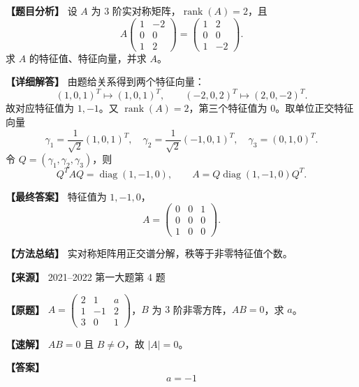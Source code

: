 \documentclass[11pt,a4paper,UTF8]{ctexart}
\newcommand{\rank}{\operatorname{rank}}
\newcommand{\diag}{\operatorname{diag}}
\begin{document}
\begin{answerbox}
\textbf{【题目分析】} 设 $A$ 为 $3$ 阶实对称矩阵，$\rank(A)=2$，且
\[
A\begin{pmatrix}1&-2\\0&0\\1&2\end{pmatrix}
=
\begin{pmatrix}1&2\\0&0\\1&-2\end{pmatrix}.
\]
求 $A$ 的特征值、特征向量，并求 $A$。

\textbf{【详细解答】} 由题给关系得到两个特征向量：
\[
(1,0,1)^T\mapsto (1,0,1)^T,\qquad
(-2,0,2)^T\mapsto (2,0,-2)^T.
\]
故对应特征值为 $1,-1$。又 $\rank(A)=2$，第三个特征值为 $0$。取单位正交特征向量
\[
\gamma_1=\frac1{\sqrt2}(1,0,1)^T,\quad
\gamma_2=\frac1{\sqrt2}(-1,0,1)^T,\quad
\gamma_3=(0,1,0)^T.
\]
令 $Q=(\gamma_1,\gamma_2,\gamma_3)$，则
\[
Q^TAQ=\diag(1,-1,0),\qquad
A=Q\diag(1,-1,0)Q^T.
\]

\textbf{【最终答案】} 特征值为 $1,-1,0$，
\[
A=\begin{pmatrix}0&0&1\\0&0&0\\1&0&0\end{pmatrix}.
\]

\textbf{【方法总结】} 实对称矩阵用正交谱分解，秩等于非零特征值个数。
\end{answerbox}

\begin{answerbox}
\textbf{【来源】} 2021--2022 第一大题第 4 题

\textbf{【原题】}
$A=\begin{pmatrix}2&1&a\\1&-1&2\\3&0&1\end{pmatrix}$，$B$ 为 $3$ 阶非零方阵，$AB=0$，求 $a$。

\textbf{【速解】}
$AB=0$ 且 $B\ne O$，故 $|A|=0$。

\textbf{【答案】}
\[a=-1\]
\end{answerbox}
\end{document}
